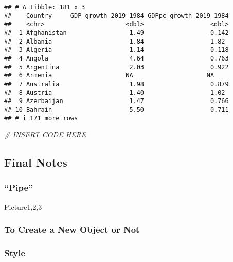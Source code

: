 \documentclass[
]{article}
\newenvironment{Shaded}{\begin{snugshade}}{\end{snugshade}}
\newcommand{\CommentTok}[1]{\textcolor[rgb]{0.56,0.35,0.01}{\textit{#1}}}
\begin{document}
\begin{verbatim}
## # A tibble: 181 x 3
##    Country     GDP_growth_2019_1984 GDPpc_growth_2019_1984
##    <chr>                      <dbl>                  <dbl>
##  1 Afghanistan                 1.49                 -0.142
##  2 Albania                     1.84                  1.82 
##  3 Algeria                     1.14                  0.118
##  4 Angola                      4.64                  0.763
##  5 Argentina                   2.03                  0.922
##  6 Armenia                    NA                    NA    
##  7 Australia                   1.98                  0.879
##  8 Austria                     1.40                  1.02 
##  9 Azerbaijan                  1.47                  0.766
## 10 Bahrain                     5.50                  0.711
## # i 171 more rows
\end{verbatim}

\begin{Shaded}
\begin{Highlighting}[]
\CommentTok{\# INSERT CODE HERE}
\end{Highlighting}
\end{Shaded}

\hypertarget{final-notes}{%
\subsection{Final Notes}\label{final-notes}}

\hypertarget{pipe}{%
\subsubsection{``Pipe''}\label{pipe}}

Picture1,2,3

\hypertarget{to-create-a-new-object-or-not}{%
\subsubsection{To Create a New Object or
Not}\label{to-create-a-new-object-or-not}}

\hypertarget{style}{%
\subsubsection{Style}\label{style}}
\end{document}
